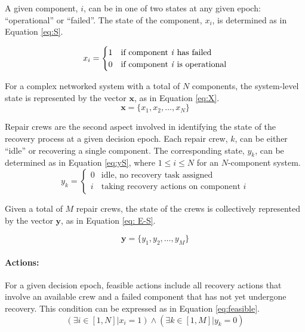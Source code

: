 \documentclass[runningheads]{llncs}
\begin{document}
 

A given component, $i$, can be in one of two states at any given epoch: ``operational'' or ``failed''. The state of the component, $x_i$, is determined as in Equation \ref{eq:S}. 

\begin{equation} x_i= \begin{cases}
    1 & \text{if component \textit{i} has failed} \\
    0 & \text{if component \textit{i} is operational} 
    \label{eq:S}
\end{cases}\end{equation}

For a complex networked system with a total of $N$ components, the system-level state is represented by the vector $\mathbf{x}$, as in Equation \ref{eq:X}.
\begin{equation}
\mathbf{x} = \{ x_1, x_2, \ldots , x_N \}
\label{eq:X}
\end{equation}

Repair crews are the second aspect involved in identifying the state of the recovery process at a given decision epoch. Each repair crew, $k$, can be either ``idle'' or recovering a single component. The corresponding state, $y_k$, can be determined as in Equation \ref{eq:yS}, where $1 \leq i \leq N$ for an $N$-component system. 
\begin{equation} y_k= \begin{cases}
    0 & \text{idle, no recovery task assigned} \\
    i & \text{taking recovery actions on component $i$}
    \label{eq:yS}
\end{cases}\end{equation}

Given a total of $M$ repair crews, the state of the crews is collectively represented by the vector $\mathbf{y}$, as in Equation \ref{eq: E-S}. 

\begin{equation}
\mathbf{y} = \{ y_1, y_2, \ldots , y_M \}
\label{eq: E-S}
\end{equation}
\paragraph{Actions:}
For a given decision epoch, feasible actions include all recovery actions that involve an available crew and a failed component that has not yet undergone recovery. This condition can be expressed as in Equation \ref{eq:feasible}. 
\begin{equation}
(\exists i \in [1,N] | x_i = 1) \land (\exists k \in [1,M] | y_k = 0)
\label{eq:feasible}
\end{equation}
\end{document}
